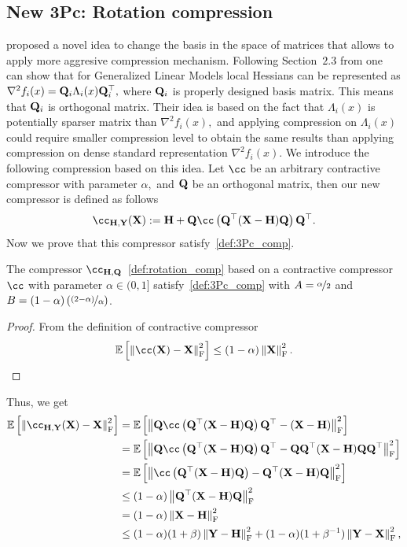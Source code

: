 \documentclass[11pt]{article}
\begin{document}
	\subsection{New 3Pc: Rotation compression}\label{apx:rot-comp}
	
	\citep{qian2021basis} proposed a novel idea to change the basis in the space of matrices that allows to apply more aggresive compression mechanism. Following Section~$2.3$ from \citep{qian2021basis} one can show that for Generalized Linear Models local Hessians can be represented as $\nabla^2f_i(x) = \mathbf{Q}_i\Lambda_i(x)\mathbf{Q}_i^\top,$ where $\mathbf{Q}_i$ is properly designed basis matrix. This means that $\mathbf{Q}_i$ is orthogonal matrix. Their idea is based on the fact that $\Lambda_i(x)$ is potentially sparser matrix than $\nabla^2f_i(x),$ and applying compression on $\Lambda_i(x)$ could require smaller compression level to obtain the same results than applying compression on dense standard representation $\nabla^2f_i(x).$ We introduce the following compression based on this idea. Let $\cc$ be an arbitrary contractive compressor with parameter $\alpha,$ and $\mathbf{Q}$ be an orthogonal matrix, then our new compressor is defined as follows 
	\begin{equation}\label{def:rotation_comp}
		\cc_{\mH,\mY}(\mX) \eqdef \mH + \mQ\cc\left(\mQ^\top(\mX-\mH)\mQ\right)\mQ^\top.
	\end{equation}
	Now we prove that this compressor satisfy~\eqref{def:3Pc_comp}.
	\begin{lemma}
		The compressor $\cc_{\mH,\mQ}$~\eqref{def:rotation_comp} based on a contractive compressor $\cc$ with parameter $\alpha\in(0,1]$ satisfy~\eqref{def:3Pc_comp} with $A=\nicefrac{\alpha}{2}$ and $B=(1-\alpha)\left(\nicefrac{(2-\alpha)}{\alpha}\right)$.
	\end{lemma}
	\begin{proof}
		From the definition of contractive compressor
		$$\ExpBr{\norm{\cc(\mX)-\mX}^2_{\rm F}} \leq (1-\alpha)\norm{\mX}^2_{\rm F}.$$
	\end{proof}
	Thus, we get
	\begin{align*}
		\ExpBr{\norm{\cc_{\mH,\mY}(\mX) - \mX}^2_{\rm F}} &= \ExpBr{\norm{\mQ\cc\left(\mQ^\top(\mX-\mH)\mQ\right)\mQ^\top - (\mX-\mH)}^2_{\rm F}}\\
		&=\ExpBr{\norm{\mQ\cc\left(\mQ^\top(\mX-\mH)\mQ\right)\mQ^\top - \mQ\mQ^\top(\mX-\mH)\mQ\mQ^\top}^2_{\rm F}}\\
		&=\ExpBr{\norm{\cc\left(\mQ^\top(\mX-\mH)\mQ\right) -\mQ^\top(\mX-\mH)\mQ}^2_{\rm F}}\\
		&\leq (1-\alpha)\norm{\mQ^\top(\mX-\mH)\mQ}^2_{\rm F}\\
		&= (1-\alpha)\norm{\mX-\mH}^2_{\rm F}\\
		&\leq (1-\alpha)(1+\beta)\norm{\mY-\mH}^2_{\rm F} + (1-\alpha)(1+\beta^{-1})\norm{\mY-\mX}^2_{\rm F},
	\end{align*}
\end{document}
